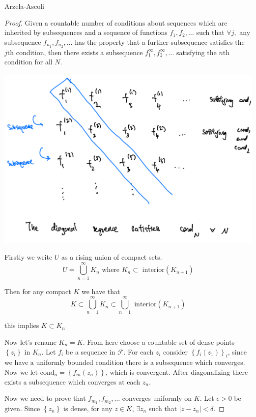 \documentclass{article}
\begin{document}
\begin{thrm}{Arzela-Ascoli}{}
\begin{proof}
Given a countable number of conditions about sequences which are inherited by subsequences and a sequence of functions \( f_1,f_2, \dots  \) such that \( \forall j, \) any subsequence \( f_{n_1}, f_{n_2}, \dots  \) has the property that a further subsequence satisfies the \( j\text{th}  \) condition, then there exists a subsequence \( f_1^{\infty}, f_2^{\infty}, \dots   \) satisfying the \( n \)th condition for all \( N \). 
\begin{center}
    \includegraphics[scale = .2]{1.pdf}
    
\end{center}

Firstly we write \( U \) as a rising union of compact sets. 
\[
    U = \bigcup_{n=1}^{\infty} K_{n}  \text{ where } K_{n} \subset \text{ interior}(K_{n + 1} ) 
\]


Then for any compact \( K \) we have that 
\[
    K \subset \bigcup_{n=1}^{\infty} K_{n} \subset \bigcup_{n=1}^{\infty} \text{ interior}(K_{n + 1} )
\]

this implies \( K \subset K_{n}  \) 

Now let's rename \( K_{n} = K  \). From here choose a countable set of dense points \( \left\{ z_{i}  \right\}  \)  in \( K_{n}  \). Let \( f_{i}  \)  be a sequence in \( \mathcal{F}  \). For each \( z_{i}  \)  consider \( \left\{ f_{i} (z_{1} ) \right\}_{i}   \), since we have a uniformly bounded condition there is a subsequence which converges. Now we let \( \text{cond}_n = \left\{ f_{m} (z_{n} ) \right\} \), which is convergent. After diagonalizing there exists a subsequence which converges at each \( z_{n}  \). 

Now we need to prove that \( f_{m_1}, f_{m_2}, \dots    \) converges uniformly on \( K \). Let \( \epsilon > 0 \) be given. Since \( \left\{ z_{n}  \right\}  \) is dense, for any \( z \in K \), \( \exists z_{n}  \) such that \( \left\lvert z - z_{n}  \right\rvert < \delta  \). 


\end{proof}
\end{thrm}
\end{document}
